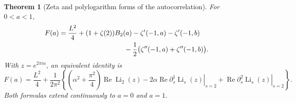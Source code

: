 \documentclass[11pt]{article}
\numberwithin{equation}{section}
\newtheorem{theorem}{Theorem}[section]
\theoremstyle{definition}
\theoremstyle{remark}
\DeclareMathOperator{\Li}{Li}
\DeclareMathOperator{\Rea}{Re}
\newcommand{\LiJ}[2]{\left.\partial_s^{#1}\Li_s(#2)\right|_{s=2}}
\begin{document}
\begin{theorem}[Zeta and polylogarithm forms of the autocorrelation]
\label{thm:loggamma}
For $0<a<1$,
\begin{align}
 F(a)={}&\frac{L^2}{4}+(1+\zeta(2))B_2(a)
        -\zeta'(-1,a)-\zeta'(-1,b)\notag\\
        &\hspace{29mm}-\frac12\bigl(\zeta''(-1,a)+\zeta''(-1,b)\bigr).
 \label{eq:F-hurwitz}
\end{align}
With $z=e^{2\pi ia}$, an equivalent identity is
\begin{equation}
 F(a)=\frac{L^2}{4}+\frac{1}{2\pi^2}
 \left\{\left(\alpha^2+\frac{\pi^2}{4}\right)\Rea\Li_2(z)
       -2\alpha\Rea\LiJ{1}{z}+\Rea\LiJ{2}{z}\right\}.
 \label{eq:F-polylog}
\end{equation}
Both formulas extend continuously to $a=0$ and $a=1$.
\end{theorem}
\end{document}
